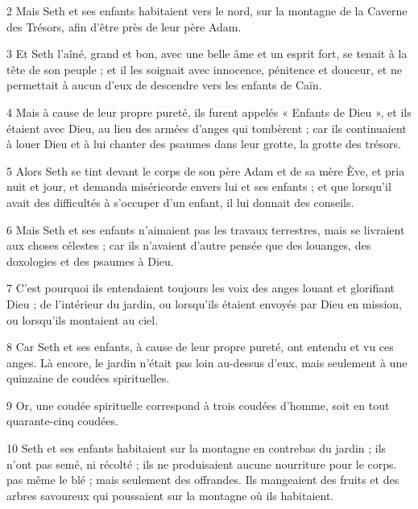\par 2 Mais Seth et ses enfants habitaient vers le nord, sur la montagne de la Caverne des Trésors, afin d'être près de leur père Adam.

\par 3 Et Seth l'aîné, grand et bon, avec une belle âme et un esprit fort, se tenait à la tête de son peuple ; et il les soignait avec innocence, pénitence et douceur, et ne permettait à aucun d'eux de descendre vers les enfants de Caïn.

\par 4 Mais à cause de leur propre pureté, ils furent appelés « Enfants de Dieu », et ils étaient avec Dieu, au lieu des armées d'anges qui tombèrent ; car ils continuaient à louer Dieu et à lui chanter des psaumes dans leur grotte, la grotte des trésors.

\par 5 Alors Seth se tint devant le corps de son père Adam et de sa mère Ève, et pria nuit et jour, et demanda miséricorde envers lui et ses enfants ; et que lorsqu'il avait des difficultés à s'occuper d'un enfant, il lui donnait des conseils.

\par 6 Mais Seth et ses enfants n'aimaient pas les travaux terrestres, mais se livraient aux choses célestes ; car ils n'avaient d'autre pensée que des louanges, des doxologies et des psaumes à Dieu.

\par 7 C'est pourquoi ils entendaient toujours les voix des anges louant et glorifiant Dieu ; de l'intérieur du jardin, ou lorsqu'ils étaient envoyés par Dieu en mission, ou lorsqu'ils montaient au ciel.

\par 8 Car Seth et ses enfants, à cause de leur propre pureté, ont entendu et vu ces anges. Là encore, le jardin n’était pas loin au-dessus d’eux, mais seulement à une quinzaine de coudées spirituelles.

\par 9 Or, une coudée spirituelle correspond à trois coudées d'homme, soit en tout quarante-cinq coudées.

\par 10 Seth et ses enfants habitaient sur la montagne en contrebas du jardin ; ils n’ont pas semé, ni récolté ; ils ne produisaient aucune nourriture pour le corps. pas même le blé ; mais seulement des offrandes. Ils mangeaient des fruits et des arbres savoureux qui poussaient sur la montagne où ils habitaient.

